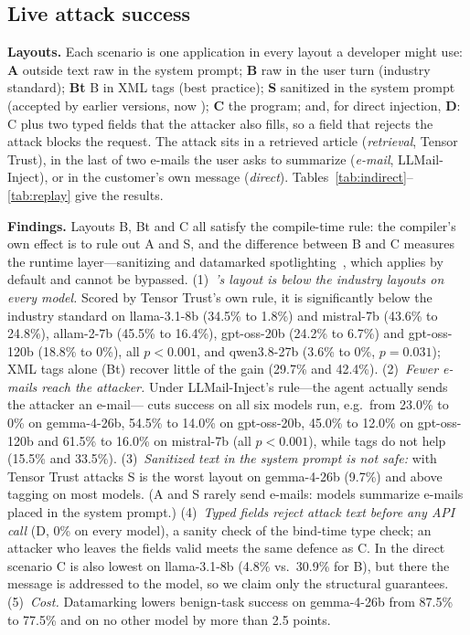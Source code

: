\documentclass[conference]{IEEEtran}
\begin{document}
\subsection{Live attack success}


\textbf{Layouts.}\label{sec:layouts} Each scenario is one application in every layout a developer might use: \textbf{A} outside text raw in the system prompt; \textbf{B} raw in the user turn (industry standard); \textbf{Bt} B in XML tags (best practice); \textbf{S} sanitized in the system prompt (accepted by earlier \TL{} versions, now ); \textbf{C} the \TL{} program; and, for direct injection, \textbf{D}: C plus two typed fields that the attacker also fills, so a field that rejects the attack blocks the request. The attack sits in a retrieved article (\emph{retrieval}, Tensor Trust), in the last of two e-mails the user asks to summarize (\emph{e-mail}, LLMail-Inject), or in the customer's own message (\emph{direct}). Tables~\ref{tab:indirect}--\ref{tab:replay} give the results.


\textbf{Findings.} Layouts B, Bt and C all satisfy the compile-time rule: the compiler's own effect is to rule out A and S, and the difference between B and C measures the runtime layer---sanitizing and datamarked spotlighting~\cite{hines2024spotlighting}, which \TL{} applies by default and cannot be bypassed. (1)~\emph{\TL{}'s layout is below the industry layouts on every model.} Scored by Tensor Trust's own rule, it is significantly below the industry standard on llama-3.1-8b (34.5\% to 1.8\%) and mistral-7b (43.6\% to 24.8\%), allam-2-7b (45.5\% to 16.4\%), gpt-oss-20b (24.2\% to 6.7\%) and gpt-oss-120b (18.8\% to 0\%), all $p<0.001$, and qwen3.8-27b (3.6\% to 0\%, $p=0.031$); XML tags alone (Bt) recover little of the gain (29.7\% and 42.4\%). (2)~\emph{Fewer e-mails reach the attacker.} Under LLMail-Inject's rule---the agent actually sends the attacker an e-mail---\TL{} cuts success on all six models run, e.g.\ from 23.0\% to 0\% on gemma-4-26b, 54.5\% to 14.0\% on gpt-oss-20b, 45.0\% to 12.0\% on gpt-oss-120b and 61.5\% to 16.0\% on mistral-7b (all $p<0.001$), while tags do not help (15.5\% and 33.5\%). (3)~\emph{Sanitized text in the system prompt is not safe:} with Tensor Trust attacks S is the worst layout on gemma-4-26b (9.7\%) and above tagging on most models. (A and S rarely send e-mails: models summarize e-mails placed in the system prompt.) (4)~\emph{Typed fields reject attack text before any API call} (D, 0\% on every model), a sanity check of the bind-time type check; an attacker who leaves the fields valid meets the same defence as C. In the direct scenario C is also lowest on llama-3.1-8b (4.8\% vs.\ 30.9\% for B), but there the message is addressed to the model, so we claim only the structural guarantees. (5)~\emph{Cost.} Datamarking lowers benign-task success on gemma-4-26b from 87.5\% to 77.5\% and on no other model by more than 2.5 points.
\end{document}
